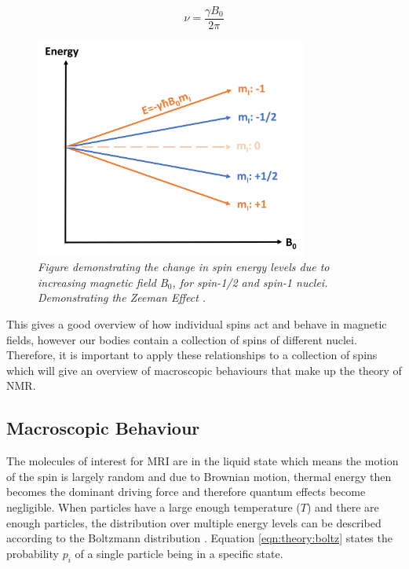 \begin{equation}
    \nu = \frac{\gamma B_0}{2\pi}
    \label{eqn:theory:Lamor}
\end{equation}

\begin{figure}
    \centering
    \includegraphics[width=0.8\textwidth]{Figures/Theory/Zeeman.png}
    \caption{\textit{Figure demonstrating the change in spin energy levels due to increasing magnetic field B$_0$, for spin-1/2 and spin-1 nuclei. Demonstrating the Zeeman Effect \cite{Zeeman1896VerslagenAfdeeling}.}}
    \label{fig:theory:zeeman}
\end{figure}

This gives a good overview of how individual spins act and behave in magnetic fields, however our bodies contain a collection of spins of different nuclei. Therefore, it is important to apply these relationships to a collection of spins which will give an overview of macroscopic behaviours that make up the theory of \ac{NMR}.

\subsection{Macroscopic Behaviour}

The molecules of interest for \ac{MRI} are in the liquid state which means the motion of the spin is largely random and due to Brownian motion, thermal energy then becomes the dominant driving force and therefore quantum effects become negligible. When particles have a large enough temperature ($T$) and there are enough particles, the distribution over multiple energy levels can be described according to the Boltzmann distribution \cite{Boltzmann1872WeitereGasmolekulen}. Equation \ref{eqn:theory:boltz} states the probability $p_i$ of a single particle being in a specific state.

